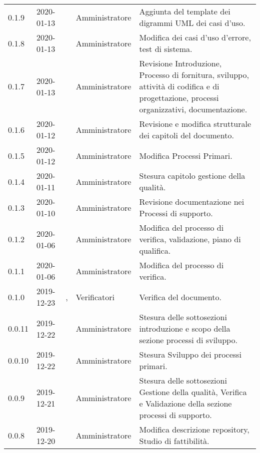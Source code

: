{\begin{longtable}{C{2cm} C{2cm}  C{3cm}  C{3cm} C{4.5cm}}
0.1.9 & 2020-01-13 & \CE{} & Amministratore & Aggiunta del template dei digrammi UML dei casi d'uso. \\

0.1.8 & 2020-01-13 & \BR{} & Amministratore & Modifica dei casi d'uso d'errore, test di sistema. \\

0.1.7 & 2020-01-13 & \AT{} & Amministratore & Revisione Introduzione, Processo di fornitura, sviluppo, attività di codifica e di progettazione, processi organizzativi, documentazione. \\

0.1.6 & 2020-01-12 & \MC{} & Amministratore & Revisione e modifica strutturale dei capitoli del documento. \\

0.1.5 & 2020-01-12 & \AT{} & Amministratore & Modifica Processi Primari. \\

0.1.4 & 2020-01-11 & \MC{} & Amministratore & Stesura capitolo gestione della qualità. \\

0.1.3 & 2020-01-10 & \MC{} & Amministratore & Revisione documentazione nei Processi di supporto. \\

0.1.2 & 2020-01-06 & \AT{} & Amministratore & Modifica del processo di verifica, validazione, piano di qualifica. \\

0.1.1 & 2020-01-06 & \AT{} & Amministratore & Modifica del processo di verifica. \\

0.1.0 & 2019-12-23 & \PF{}, \CE{} & Verificatori & Verifica del documento. \\

0.0.11 & 2019-12-22 & \PF{} & Amministratore & Stesura delle sottosezioni introduzione e scopo della sezione processi di sviluppo. \\

0.0.10 & 2019-12-22 & \PF{}  & Amministratore & Stesura Sviluppo dei processi primari. \\

0.0.9 & 2019-12-21 & \PF{} & Amministratore & Stesura delle sottosezioni Gestione della qualità, Verifica e Validazione della sezione processi di supporto. \\

0.0.8 & 2019-12-20 & \MC{} & Amministratore & Modifica descrizione repository, Studio di fattibilità. \\


\end{longtable}}
